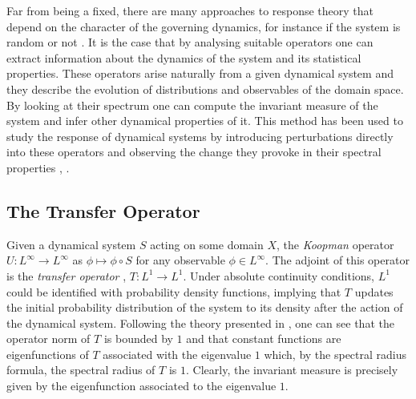 Far from being a fixed, there are many approaches to response theory that depend on the character of the governing dynamics, for instance if the system is random or not \cite{review}. It is the case that by analysing suitable operators one can extract information about the dynamics of the system and its statistical properties. These operators arise naturally from a given dynamical system and they describe the evolution of distributions and observables of the domain space. By looking at their spectrum one can compute the invariant measure of the system and infer other dynamical properties of it. This method has been used to study the response of dynamical systems by introducing perturbations directly into these operators and observing the change they provoke in their spectral properties \cite{review}, \cite{chekroun}.

\subsection*{The Transfer Operator}

Given a dynamical system $S$ acting on some domain $X$, the \emph{Koopman} operator $U:L^{\infty}\longrightarrow L^{\infty}$ as $\phi \mapsto \phi \circ S$ for any observable $\phi \in L^{\infty}$. The adjoint of this operator is the \emph{transfer operator} \cite{baladi}, $T:L^1 \longrightarrow L^1$. Under absolute continuity conditions, $L^1$ could be identified with probability density functions, implying that $T$ updates the initial probability distribution of the system to its density after the action of the dynamical system. Following the theory presented in \cite{lasota}, one can see that the operator norm of $T$ is bounded by $1$ and that constant functions are eigenfunctions of $T$ associated with the eigenvalue $1$ which, by the spectral radius formula, the spectral radius of $T$ is $1$. Clearly, the invariant measure is precisely given by the eigenfunction associated to the eigenvalue $1$.

